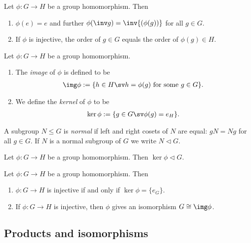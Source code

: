 \documentclass{article}
\begin{document}
\setcounter{theorem}{4}
\begin{lemma}
	Let $\phi:G\to H$ be a group homomorphism. Then
	\begin{enumerate}
		\item $\phi(e)=e$ and further $\phi(\inv g)=\inv{(\phi(g))}$ for all $g\in G$.
		\item If $\phi$ is injective, the order of $g\in G$ equals the order of $\phi(g)\in H$.
	\end{enumerate}
\end{lemma}

\begin{definition}
	Let $\phi:G\to H$ be a group homomorphism.
	\begin{enumerate}
		\item The \emph{image} of $\phi$ is defined to be \begin{align*}
			      \img\phi := \{h\in H \sv h=\phi(g)\text{ for some }g\in G\}.
		      \end{align*}
		\item We define the \emph{kernel} of $\phi$ to be \begin{align*}
			      \ker \phi := \{g\in G \sv \phi(g) = e_H\}.
		      \end{align*}
	\end{enumerate}
\end{definition}

\begin{definition}
	A subgroup $N\leq G$ is \emph{normal} if left and right cosets
	of $N$ are equal: $gN=Ng$ for all $g\in G$. If $N$ is a normal
	subgroup of $G$ we write $N \triangleleft G$.
\end{definition}


\begin{proposition}
	Let $\phi:G\to H$ be a group homomorphism. Then $\ker\phi\triangleleft G$.
\end{proposition}

\begin{proposition}
	Let $\phi: G\to H$ be a group homomorphism. Then
	\begin{enumerate}
		\item $\phi:G\to H$ is injective if and only if $\ker\phi=\{e_G\}$.
		\item If $\phi:G\to H$ is injective, then $\phi$ gives an isomorphism $G\cong \img\phi$.
	\end{enumerate}
\end{proposition}

\subsection{Products and isomorphisms}
\end{document}
